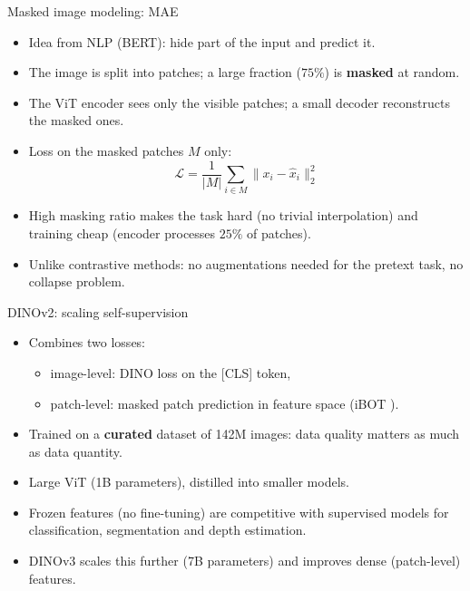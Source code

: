 \documentclass[xcolor=pdftex,dvipsnames,table]{beamer}
\begin{document}
\begin{frame}{Masked image modeling: MAE \cite{He2022}}
\begin{itemize}
\item Idea from NLP (BERT): hide part of the input and predict it.
\item The image is split into patches; a large fraction ($75\%$) is \textbf{masked} at random.
\item The ViT encoder sees only the visible patches; a small decoder reconstructs the masked ones.
\item Loss on the masked patches $M$ only:
\begin{equation*}
\mathcal{L} = \frac{1}{|M|}\sum_{i \in M} \| x_i - \hat{x}_i \|_2^2
\end{equation*}
\item High masking ratio makes the task hard (no trivial interpolation) and training cheap (encoder processes $25\%$ of patches).
\item Unlike contrastive methods: no augmentations needed for the pretext task, no collapse problem.
\end{itemize}
\end{frame}

\begin{frame}{DINOv2: scaling self-supervision \cite{Oquab2024}}
\begin{itemize}
\item Combines two losses:
\begin{itemize}
   \item image-level: DINO loss on the [CLS] token,
   \item patch-level: masked patch prediction in feature space (iBOT \cite{Zhou2022}).
\end{itemize}
\item Trained on a \textbf{curated} dataset of 142M images: data quality matters as much as data quantity.
\item Large ViT (1B parameters), distilled into smaller models.
\item Frozen features (no fine-tuning) are competitive with supervised models for classification, segmentation and depth estimation.
\item DINOv3 \cite{Simeoni2025} scales this further (7B parameters) and improves dense (patch-level) features.
\end{itemize}
\end{frame}
\end{document}
